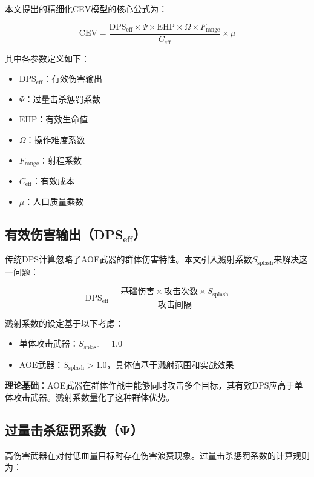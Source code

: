 \documentclass[a4paper,12pt]{article}
\begin{document}
本文提出的精细化CEV模型的核心公式为：

\begin{equation}
\text{CEV} = \frac{\text{DPS}_{\text{eff}} \times \Psi \times \text{EHP} \times \Omega \times F_{\text{range}}}{C_{\text{eff}}} \times \mu
\end{equation}

其中各参数定义如下：

\begin{itemize}
    \item $\text{DPS}_{\text{eff}}$：有效伤害输出
    \item $\Psi$：过量击杀惩罚系数
    \item $\text{EHP}$：有效生命值
    \item $\Omega$：操作难度系数
    \item $F_{\text{range}}$：射程系数
    \item $C_{\text{eff}}$：有效成本
    \item $\mu$：人口质量乘数
\end{itemize}

\subsection{有效伤害输出（DPS$_{\text{eff}}$）}

传统DPS计算忽略了AOE武器的群体伤害特性。本文引入溅射系数$S_{\text{splash}}$来解决这一问题：

\begin{equation}
\text{DPS}_{\text{eff}} = \frac{\text{基础伤害} \times \text{攻击次数} \times S_{\text{splash}}}{\text{攻击间隔}}
\end{equation}

溅射系数的设定基于以下考虑：
\begin{itemize}
    \item 单体攻击武器：$S_{\text{splash}} = 1.0$
    \item AOE武器：$S_{\text{splash}} > 1.0$，具体值基于溅射范围和实战效果
\end{itemize}

\textbf{理论基础}：AOE武器在群体作战中能够同时攻击多个目标，其有效DPS应高于单体攻击武器。溅射系数量化了这种群体优势。

\subsection{过量击杀惩罚系数（Ψ）}

高伤害武器在对付低血量目标时存在伤害浪费现象。过量击杀惩罚系数的计算规则为：
\end{document}
